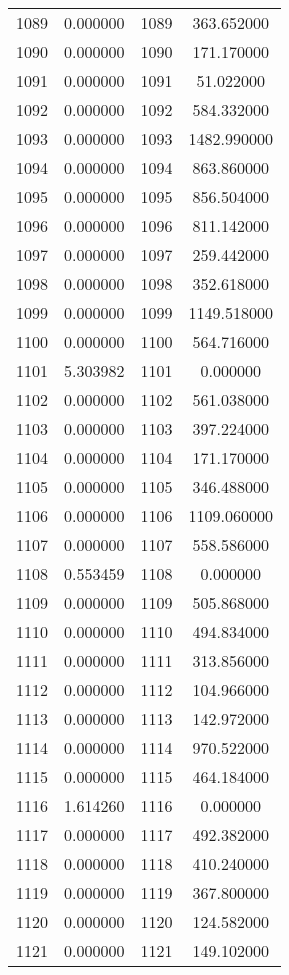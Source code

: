 \documentclass[12pt]{article}
\begin{document}
\begin{longtable}{@{}cccc@{}}
1089 & 0.000000 & 1089 & 363.652000 \\
1090 & 0.000000 & 1090 & 171.170000 \\
1091 & 0.000000 & 1091 & 51.022000 \\
1092 & 0.000000 & 1092 & 584.332000 \\
1093 & 0.000000 & 1093 & 1482.990000 \\
1094 & 0.000000 & 1094 & 863.860000 \\
1095 & 0.000000 & 1095 & 856.504000 \\
1096 & 0.000000 & 1096 & 811.142000 \\
1097 & 0.000000 & 1097 & 259.442000 \\
1098 & 0.000000 & 1098 & 352.618000 \\
1099 & 0.000000 & 1099 & 1149.518000 \\
1100 & 0.000000 & 1100 & 564.716000 \\
1101 & 5.303982 & 1101 & 0.000000 \\
1102 & 0.000000 & 1102 & 561.038000 \\
1103 & 0.000000 & 1103 & 397.224000 \\
1104 & 0.000000 & 1104 & 171.170000 \\
1105 & 0.000000 & 1105 & 346.488000 \\
1106 & 0.000000 & 1106 & 1109.060000 \\
1107 & 0.000000 & 1107 & 558.586000 \\
1108 & 0.553459 & 1108 & 0.000000 \\
1109 & 0.000000 & 1109 & 505.868000 \\
1110 & 0.000000 & 1110 & 494.834000 \\
1111 & 0.000000 & 1111 & 313.856000 \\
1112 & 0.000000 & 1112 & 104.966000 \\
1113 & 0.000000 & 1113 & 142.972000 \\
1114 & 0.000000 & 1114 & 970.522000 \\
1115 & 0.000000 & 1115 & 464.184000 \\
1116 & 1.614260 & 1116 & 0.000000 \\
1117 & 0.000000 & 1117 & 492.382000 \\
1118 & 0.000000 & 1118 & 410.240000 \\
1119 & 0.000000 & 1119 & 367.800000 \\
1120 & 0.000000 & 1120 & 124.582000 \\
1121 & 0.000000 & 1121 & 149.102000 \\

\end{longtable}
\end{document}
